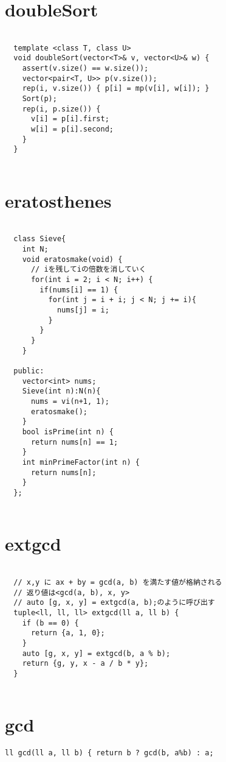 \documentclass{jsarticle}
\begin{document}
\color{white}
\section{doubleSort}
\color{black}
\begin{lstlisting}[caption=doubleSort]

  template <class T, class U>
  void doubleSort(vector<T>& v, vector<U>& w) {
    assert(v.size() == w.size());
    vector<pair<T, U>> p(v.size());
    rep(i, v.size()) { p[i] = mp(v[i], w[i]); }
    Sort(p);
    rep(i, p.size()) {
      v[i] = p[i].first;
      w[i] = p[i].second;
    }
  }
  

\end{lstlisting}

\color{white}
\section{eratosthenes}
\color{black}
\begin{lstlisting}[caption=eratosthenes]

  class Sieve{
    int N;
    void eratosmake(void) {
      // iを残してiの倍数を消していく
      for(int i = 2; i < N; i++) {
        if(nums[i] == 1) {
          for(int j = i + i; j < N; j += i){
            nums[j] = i;
          }
        }
      }
    }
  
  public:
    vector<int> nums;
    Sieve(int n):N(n){
      nums = vi(n+1, 1);
      eratosmake();
    }
    bool isPrime(int n) {
      return nums[n] == 1;
    }
    int minPrimeFactor(int n) {
      return nums[n];
    }
  };
  

\end{lstlisting}

\color{white}
\section{extgcd}
\color{black}
\begin{lstlisting}[caption=extgcd]

  // x,y に ax + by = gcd(a, b) を満たす値が格納される
  // 返り値は<gcd(a, b), x, y>
  // auto [g, x, y] = extgcd(a, b);のように呼び出す
  tuple<ll, ll, ll> extgcd(ll a, ll b) {
    if (b == 0) {
      return {a, 1, 0};
    }
    auto [g, x, y] = extgcd(b, a % b);
    return {g, y, x - a / b * y};
  }
  

\end{lstlisting}

\color{white}
\section{gcd}
\color{black}
\begin{lstlisting}[caption=gcd]
ll gcd(ll a, ll b) { return b ? gcd(b, a%b) : a;

\end{lstlisting}
\end{document}
